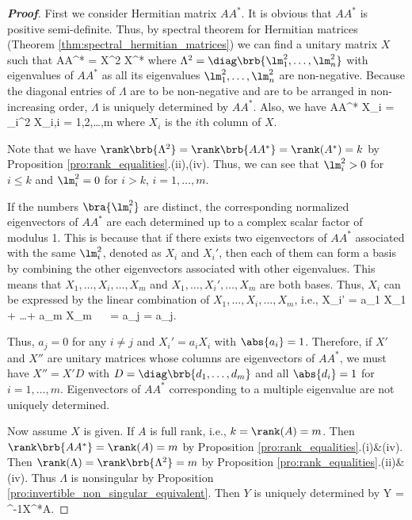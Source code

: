 \begin{proof}[\bf Proof]
First we consider Hermitian matrix $AA^*$. It is obvious that $AA^*$ is positive semi-definite. Thus, by spectral theorem for Hermitian matrices (Theorem \ref{thm:spectral_hermitian_matrices}) we
can find a unitary matrix $X$ such that
\be
AA^* = X\Lambda^2 X^*
\ee
where $\Lambda^2 = \diag\brb{\lm_1^2,\dots,\lm_n^2}$ with eigenvalues of $AA^*$ as all its eigenvalues $\lm_1^2,\dots,\lm_n^2$ are non-negative. Because the diagonal entries of $\Lambda$ are to be
non-negative and are to be arranged in non-increasing order, $\Lambda$ is uniquely determined by $AA^*$. Also, we have
\be
AA^* X_i = \lm_i^2 X_i,\quad i = 1,2,\dots,m
\ee
where $X_i$ is the $i$th column of $X$.

Note that we have $\rank\brb{\Lambda^2} = \rank\brb{AA^*} = \rank (A^*) = k$ by Proposition \ref{pro:rank_equalities}.(ii),(iv). Thus, we can see that $\lm_i^2 > 0$ for $i\leq k$ and $\lm_i^2 = 0$ for $i>k$, $i=1,\dots,m$.

If the numbers $\bra{\lm_i^2}$ are distinct, the corresponding normalized eigenvectors of $AA^*$ are each determined up to a complex scalar factor of modulus
1. This is because that if there exists two eigenvectors of $AA^*$ associated with the same $\lm_i^2$, denoted as $X_i$ and $X_i'$, then each of them can form a basis by combining the other
eigenvectors associated with other eigenvalues. This means that $X_1,\dots,X_i,\dots,X_m$ and $X_1,\dots,X_i',\dots,X_m$ are both bases. Thus, $X_i$ can be expressed by the linear combination of
$X_1,\dots,X_i,\dots,X_m$, i.e.,
\be
X_i' = a_1 X_1 + \dots + a_m X_m \ \ra\  = a_j = a_j.
\ee

Thus, $a_j = 0$ for any $i\neq j$ and $X_i' = a_i X_i$ with $\abs{a_i} = 1$. Therefore, if $X'$ and $X''$ are unitary matrices whose columns are eigenvectors of $AA^*$, we must have $X'' = X'D$
with $D = \diag\brb{d_1,\dots,d_m}$ and all $\abs{d_i} = 1$ for $i = 1,\dots,m$. Eigenvectors of $AA^*$ corresponding to a multiple eigenvalue are not uniquely determined.%

Now assume $X$ is given. If $A$ is full rank, i.e., $k = \rank(A) = m$. Then $\rank\brb{AA^*} = \rank (A) =m$ by Proposition \ref{pro:rank_equalities}.(i)\&(iv). Then $\rank(\Lambda) =
\rank\brb{\Lambda^2} = m$ by Proposition \ref{pro:rank_equalities}.(ii)\&(iv). Thus $\Lambda$ is nonsingular by Proposition \ref{pro:invertible_non_singular_equivalent}. Then $Y$ is uniquely determined by
\be
Y = \Lambda^{-1}X^*A.
\ee


\end{proof}
